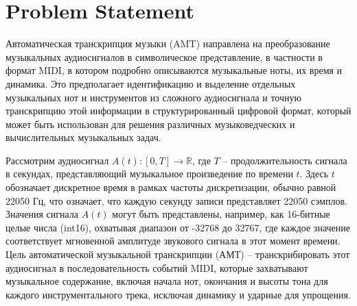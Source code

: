 \documentclass[a4paper, 12pt]{article} %
\begin{document}
\section{Problem Statement}


Автоматическая транскрипция музыки (AMT) направлена на преобразование музыкальных аудиосигналов в символическое представление, в частности в формат MIDI, в котором подробно описываются музыкальные ноты, их время и динамика. Это предполагает идентификацию и выделение отдельных музыкальных нот и инструментов из сложного аудиосигнала и точную транскрипцию этой информации в структурированный цифровой формат, который может быть использован для решения различных музыковедческих и вычислительных музыкальных задач.


Рассмотрим аудиосигнал \(A(t): [0, T] \rightarrow \mathbb{R}\), где \(T\) – продолжительность сигнала в секундах, представляющий музыкальное произведение по времени \(t\). Здесь \(t\) обозначает дискретное время в рамках частоты дискретизации, обычно равной 22050 Гц, что означает, что каждую секунду записи представляет 22050 сэмплов. Значения сигнала \(A(t)\) могут быть представлены, например, как 16-битные целые числа (int16), охватывая диапазон от -32768 до 32767, где каждое значение соответствует мгновенной амплитуде звукового сигнала в этот момент времени. Цель автоматической музыкальной транскрипции (АМТ) – транскрибировать этот аудиосигнал в последовательность событий MIDI, которые захватывают музыкальное содержание, включая начала нот, окончания и высоты тона для каждого инструментального трека, исключая динамику и ударные для упрощения.

\end{document}
